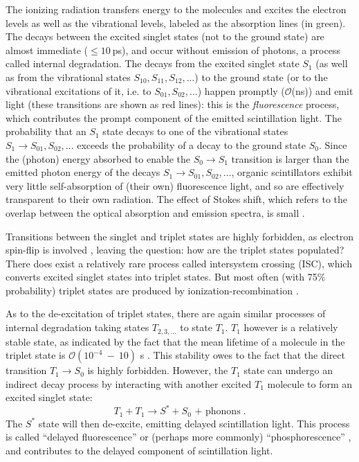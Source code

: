 The ionizing radiation transfers energy to the molecules and excites the electron levels as well as the vibrational levels, labeled as the absorption lines (in green). The decays between the excited singlet states (not to the ground state) are almost immediate ($\leq 10~$ps), and occur without emission of photons, a process called internal degradation. The decays from the excited singlet state $S_1$ (as well as from the vibrational states $S_{10},S_{11},S_{12},...$) to the ground state (or to the vibrational excitations of it, i.e. to $S_{01}, S_{02}, ...$) happen promptly ($\mathcal{O}$(ns)) and emit light (these transitions are shown as red lines): this is the {\em fluorescence} process, which contributes the prompt component of the emitted scintillation light. The probability that an $S_1$ state decays to one of the vibrational states $S_1 \to S_{01},S_{02},...$ exceeds the probability of a decay to the ground state $S_0$. Since the (photon) energy absorbed to enable the $S_0 \to S_1$ transition is larger than the emitted photon energy of the decays $S_1 \to S_{01}, S_{02},...$, organic scintillators exhibit very little self-absorption of (their own) fluorescence light, and so are effectively transparent to their own radiation. The effect of Stokes shift, which refers to the overlap between the optical absorption and emission spectra, is small \cite{leo2012techniques,knoll2010radiation}. 

Transitions between the singlet and triplet states are highly forbidden, as electron spin-flip is involved \cite{von2015measurement,sorensen2016temperature}, leaving the question: how are the triplet states populated? There does exist a relatively rare process called intersystem crossing (ISC), which converts excited singlet states into triplet states. But most often (with 75\% probability) triplet states are produced by ionization-recombination \cite{von2015measurement,dunger2018topological}.

As to the de-excitation of triplet states, there are again similar processes of internal degradation taking states $T_{2,3, ...}$ to state $T_1$. $T_1$ however is a relatively stable state, as indicated by the fact that the mean lifetime of a molecule in the triplet state is $\mathcal{O}(10^{-4}~-~10)$ s \cite{mcquarrie1997physical}. This stability owes to the fact that the direct transition $T_1\to S_0$ is highly forbidden. However, the $T_1$ state can undergo an indirect decay process by interacting with another excited $T_1$ molecule to form an excited singlet state:
\begin{equation}
T_1+T_1\to S^*+S_0 \text{ + phonons}\;.
\end{equation}
The $S^*$ state will then de-excite, emitting delayed scintillation light. This process is called ``delayed fluorescence'' or (perhaps more commonly) ``phosphorescence'' \cite{leo2012techniques}, and contributes to the delayed component of scintillation light.

